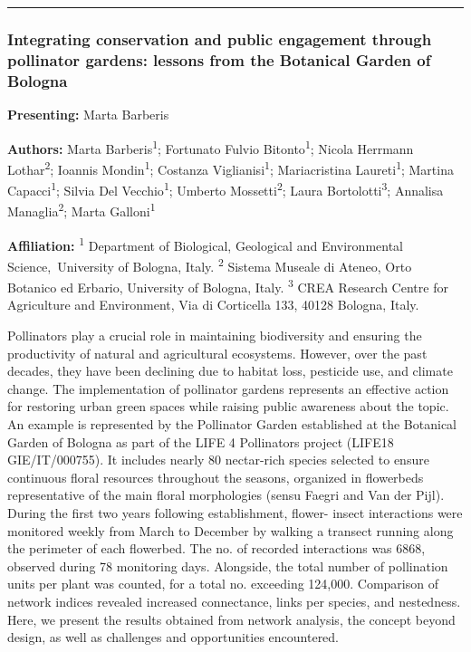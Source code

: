 \documentclass[
  letterpaper,
  DIV=11,
  numbers=noendperiod]{scrartcl}
\begin{document}
\begin{center}\rule{0.5\linewidth}{0.5pt}\end{center}

\subsubsection{Integrating conservation and public engagement through
pollinator gardens: lessons from the Botanical Garden of
Bologna}\label{integrating-conservation-and-public-engagement-through-pollinator-gardens-lessons-from-the-botanical-garden-of-bologna}

\textbf{Presenting:} Marta Barberis

\textbf{Authors:} Marta Barberis\textsuperscript{1}; Fortunato Fulvio
Bitonto\textsuperscript{1}; Nicola Herrmann Lothar\textsuperscript{2};
Ioannis Mondin\textsuperscript{1}; Costanza
Viglianisi\textsuperscript{1}; Mariacristina Laureti\textsuperscript{1};
Martina Capacci\textsuperscript{1}; Silvia Del
Vecchio\textsuperscript{1}; Umberto Mossetti\textsuperscript{2}; Laura
Bortolotti\textsuperscript{3}; Annalisa Managlia\textsuperscript{2};
Marta Galloni\textsuperscript{1}

\textbf{Affiliation:} \textsuperscript{1} Department of Biological,
Geological and Environmental Science,~University of Bologna, Italy.
\textsuperscript{2} Sistema Museale di Ateneo, Orto Botanico ed Erbario,
University of Bologna, Italy. \textsuperscript{3} CREA Research Centre
for Agriculture and Environment, Via di Corticella 133, 40128 Bologna,
Italy.

Pollinators play a crucial role in maintaining biodiversity and ensuring
the productivity of natural and agricultural ecosystems. However, over
the past decades, they have been declining due to habitat loss,
pesticide use, and climate change. The implementation of pollinator
gardens represents an effective action for restoring urban green spaces
while raising public awareness about the topic. An example is
represented by the Pollinator Garden established at the Botanical Garden
of Bologna as part of the LIFE 4 Pollinators project (LIFE18
GIE/IT/000755). It includes nearly 80 nectar-rich species selected to
ensure continuous floral resources throughout the seasons, organized in
flowerbeds representative of the main floral morphologies (sensu Faegri
and Van der Pijl). During the first two years following establishment,
flower- insect interactions were monitored weekly from March to December
by walking a transect running along the perimeter of each flowerbed. The
no. of recorded interactions was 6868, observed during 78 monitoring
days. Alongside, the total number of pollination units per plant was
counted, for a total no. exceeding 124,000. Comparison of network
indices revealed increased connectance, links per species, and
nestedness. Here, we present the results obtained from network analysis,
the concept beyond design, as well as challenges and opportunities
encountered.
\end{document}
